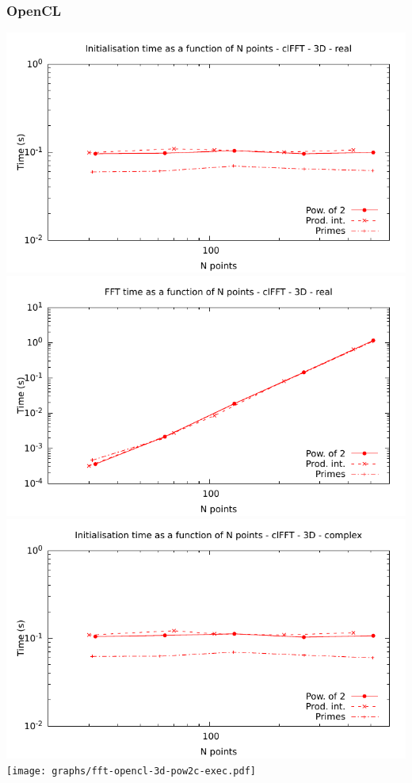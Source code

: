 \documentclass[12pt, a4paper]{article}
\begin{document}
\subsubsection{OpenCL}
\includegraphics[height=8cm]{graphs/fft-opencl-3d-pow2-r-init.pdf}\\
\includegraphics[height=8cm]{graphs/fft-opencl-3d-pow2-r-exec.pdf}\\
\includegraphics[height=8cm]{graphs/fft-opencl-3d-pow2-c-init.pdf}\\
\texttt{[image: graphs/fft-opencl-3d-pow2c-exec.pdf]}\\
\end{document}
